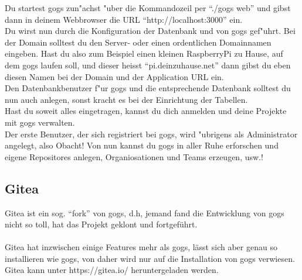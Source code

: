 \documentclass[german,a4paper]{report}
\begin{document}
Du startest gogs zun"achst "uber die Kommandozeil per ``./gogs web'' und gibst dann in
deinem Webbrowser die URL ``http://localhost:3000'' ein.\\
Du wirst nun durch die Konfiguration der Datenbank und von gogs gef"uhrt. Bei der Domain
solltest du den Server- oder einen ordentlichen Domainnamen eingeben. Hast du also zum
Beispiel einen kleinen RaspberryPi zu Hause, auf dem gogs laufen soll, und dieser heisst
``pi.deinzuhause.net'' dann gibst du eben diesen Namen bei der Domain und der Application
URL ein.\\
Den Datenbankbenutzer f"ur gogs und die entsprechende Datenbank solltest du nun auch
anlegen, sonst kracht es bei der Einrichtung der Tabellen.\\
Hast du soweit alles eingetragen, kannst du dich anmelden und deine Projekte mit gogs
verwalten.\\
Der erste Benutzer, der sich registriert bei gogs, wird "ubrigens als Administrator
angelegt, also Obacht! Von nun kannst du gogs in aller Ruhe erforschen und
eigene Repositores anlegen, Organiosationen und Teams erzeugen, usw.!

\subsection{Gitea}

Gitea ist ein sog. ``fork'' von gogs, d.h, jemand fand die Entwicklung von gogs nicht so
toll, hat das Projekt geklont und fortgeführt.\\
\\
Gitea hat inzwischen einige Features mehr als gogs, lässt sich aber genau so installieren
wie gogs, von daher wird nur auf die Installation von gogs verwiesen.
Gitea kann unter https://gitea.io/ heruntergeladen werden.
\end{document}
